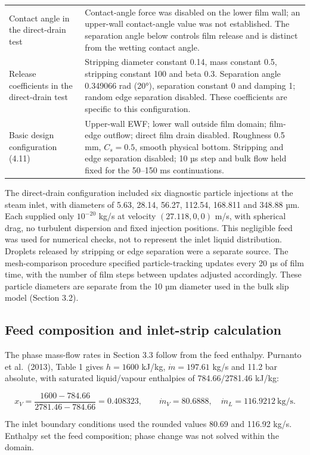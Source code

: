 \documentclass[12pt]{article}
\begin{document}
{\begin{longtable}[]{@{}
  >{\raggedright\arraybackslash}p{}
  >{\raggedright\arraybackslash}p{}@{}}
Contact angle in the direct-drain test & Contact-angle force was disabled on the lower film wall; an upper-wall contact-angle value was not established. The separation angle below controls film release and is distinct from the wetting contact angle. \\
Release coefficients in the direct-drain test & Stripping diameter constant 0.14, mass constant 0.5, stripping constant 100 and beta 0.3. Separation angle 0.349066 rad (20°), separation constant 0 and damping 1; random edge separation disabled. These coefficients are specific to this configuration. \\
Basic design configuration (4.11) & Upper-wall EWF; lower wall outside film domain; film-edge outflow; direct film drain disabled. Roughness 0.5 mm, \(C_s=0.5\), smooth physical bottom. Stripping and edge separation disabled; 10 µs step and bulk flow held fixed for the 50--150 ms continuations. \\
\end{longtable}
}
\endgroup

The direct-drain configuration included six diagnostic particle injections at the steam inlet, with diameters of 5.63, 28.14, 56.27, 112.54, 168.811 and 348.88 µm. Each supplied only \(10^{-20}\) kg/s at velocity \((27.118,0,0)\) m/s, with spherical drag, no turbulent dispersion and fixed injection positions. This negligible feed was used for numerical checks, not to represent the inlet liquid distribution. Droplets released by stripping or edge separation were a separate source. The mesh-comparison procedure specified particle-tracking updates every 20 µs of film time, with the number of film steps between updates adjusted accordingly. These particle diameters are separate from the 10 µm diameter used in the bulk slip model (Section 3.2).

\subsection{Feed composition and inlet-strip calculation}\label{a.2.-feed-composition-and-inlet-strip-calculation}

\par\noindent\begin{minipage}{\linewidth}
The phase mass-flow rates in Section 3.3 follow from the feed enthalpy. Purnanto et al.~(2013), Table 1 gives \(h=1600\) kJ/kg, \(\dot m=197.61\) kg/s and 11.2 bar absolute, with saturated liquid/vapour enthalpies of 784.66/2781.46 kJ/kg:

\[
x_V=\frac{1600-784.66}{2781.46-784.66}=0.408323,
\qquad \dot m_V=80.6888,\quad \dot m_L=116.9212\ \mathrm{kg/s}.
\tag{A1}
\]

The inlet boundary conditions used the rounded values 80.69 and 116.92 kg/s. Enthalpy set the feed composition; phase change was not solved within the domain.
\end{minipage}\par\medskip
\end{document}
